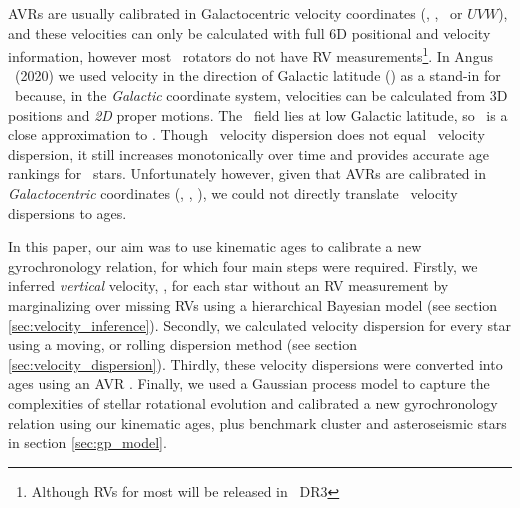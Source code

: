 AVRs are usually calibrated in Galactocentric velocity coordinates (\vx, \vy,
\vz\ or $UVW$), and these velocities can only be calculated with full 6D
positional and velocity information, however most \kepler\ rotators do not
have RV measurements\footnote{Although RVs for most will be released in \gaia\
DR3}.
In Angus \etal\ (2020) we used velocity in the direction of Galactic latitude
(\vb) as a stand-in for \vz\ because, in the {\it Galactic} coordinate system,
velocities can be calculated from 3D positions and {\it 2D} proper motions.
The \kepler\ field lies at low Galactic latitude, so \vb\ is a close
approximation to \vz.
Though \vb\ velocity dispersion does not equal \vz\ velocity dispersion, it
still increases monotonically over time and provides accurate age rankings for
\kepler\ stars.
Unfortunately however, given that AVRs are calibrated in {\it Galactocentric}
coordinates (\vx, \vy, \vz), we could not directly translate \vb\ velocity
dispersions to ages.

In this paper, our aim was to use kinematic ages to calibrate a new
gyrochronology relation, for which four main steps were required.
Firstly, we inferred {\it vertical} velocity, \vz, for each star without an RV
measurement by marginalizing over missing RVs using a hierarchical Bayesian
model (see section \ref{sec:velocity_inference}).
Secondly, we calculated velocity dispersion for every star using a moving, or
rolling dispersion method (see section \ref{sec:velocity_dispersion}).
Thirdly, these velocity dispersions were converted into ages using an AVR
\citep[][section \ref{sec:avr}]{yu2018}.
Finally, we used a Gaussian process model to capture the complexities of
stellar rotational evolution and calibrated a new gyrochronology relation
using our kinematic ages, plus benchmark cluster and asteroseismic stars in
section \ref{sec:gp_model}.
